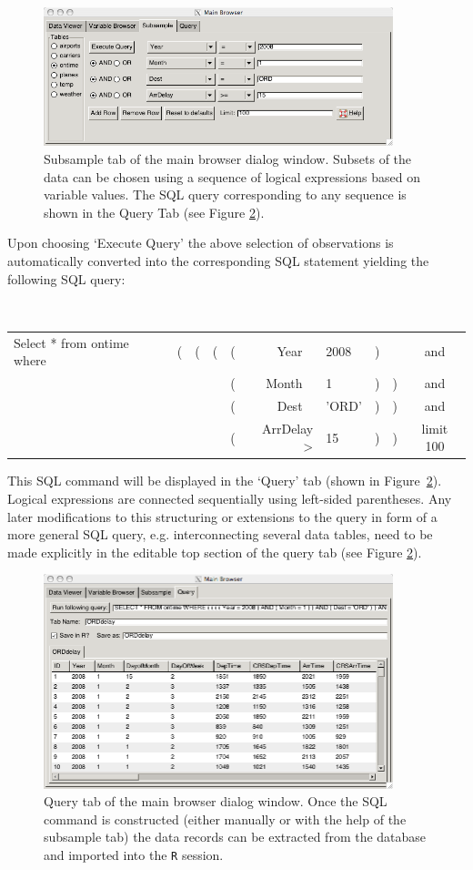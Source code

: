 \documentclass[11pt]{tise_style}
\begin{document}
\begin{figure}[htbp] %
   \centering
   \includegraphics[width=4in]{db-sample.png} 
   \caption{Subsample tab of the main browser dialog window. Subsets of the data can be chosen using a sequence of logical expressions based on variable values. The SQL query corresponding to any sequence is shown in the Query Tab (see Figure \ref{dbquery}).}
   \label{dbsample}
\end{figure}

Upon choosing `Execute Query' the above selection of observations is automatically converted into the corresponding SQL statement yielding the following SQL query:

{\tt
\begin{tabular}{lllllr@{=\ }lllc}
 Select * from ontime where & ( & ( & ( & (& Year \  & 2008 &) && and \\
&&& &(& Month \ & 1 & ) & ) & and \\
&&& & (& Dest \ & 'ORD' & )& ) & and \\
&&& & (& ArrDelay > & 15& )& ) & limit 100
\end{tabular}
}

 
This SQL command will be displayed in the `Query' tab (shown in Figure~\ref{dbquery}). Logical expressions are connected sequentially using left-sided parentheses. Any later modifications to this structuring or extensions to the query in form of a more general SQL query, e.g. interconnecting several data tables, need to be made explicitly in the editable top section of the query tab (see Figure \ref{dbquery}).     \\[.25cm]
\begin{figure}[htbp] %
   \centering
   \includegraphics[width=4in]{db-query.png} 
   \caption{Query tab of the main browser dialog window. Once the SQL command is constructed (either manually or with the help of the subsample tab) the data records can be extracted from the database and imported into the {\tt R} session.}
   \label{dbquery}
\end{figure}
\end{document}
